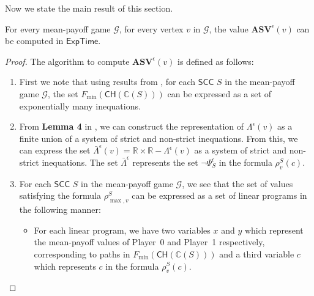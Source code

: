 Now we state the main result of this section.
\begin{theorem}
    For every mean-payoff game $\mathcal{G}$, for every vertex $v$ in $\mathcal{G}$, the value $\mathbf{ASV}^{\epsilon}(v)$ can be computed in $\mathsf{ExpTime}$.
\end{theorem}
\begin{proof}
The algorithm to compute $\mathbf{ASV}^{\epsilon}(v)$ is defined as follows:
\begin{enumerate}
    \item First we note that using 
    results from \cite{CDEHR10},
    for each $\mathsf{SCC}$ $S$ in the mean-payoff game $\mathcal{G}$, the set $F_{\min}(\mathsf{CH}(\mathbb{C}(S)))$ can be expressed as a set of exponentially many inequations.
    \item From \textbf{Lemma 4} in \cite{BR15}, we can construct the representation of $\Lambda^{\epsilon}(v)$ as a finite union of a system of strict and non-strict inequations. From this, we can express the set $\bar{\Lambda}^{\epsilon}(v) = \mathbb{R} \times \mathbb{R} - \Lambda^{\epsilon}(v)$ as a system of strict and non-strict inequations. The set $\bar{\Lambda}^{\epsilon}$ represents the set $\neg \Psi_S^{\epsilon}$ in the formula $\rho^S_{v}(c)$.
    \item For each $\mathsf{SCC}$ $S$ in the mean-payoff game $\mathcal{G}$, we see that the set of values satisfying the formula $\rho^S_{\max,v}$ can be expressed as a set of linear programs in the following manner: 
    \begin{itemize}
      \item For each linear program, we have two variables $x$ and $y$ which represent the mean-payoff values of Player~0 and Player~1 respectively, corresponding to paths in $F_{\min}(\mathsf{CH}(\mathbb{C}(S)))$ and a third variable $c$ which represents $c$ in the formula $\rho^S_{v}(c)$.

\end{itemize}
\end{enumerate}
\end{proof}
